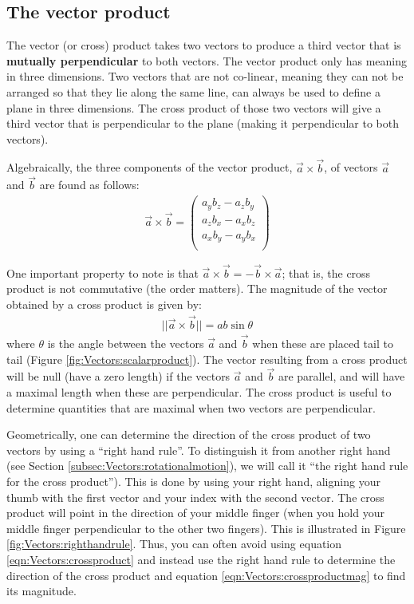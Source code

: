 \subsection{The vector product}
The vector (or cross) product takes two vectors to produce a third vector that is \textbf{mutually perpendicular} to both vectors. The vector product only has meaning in three dimensions. Two vectors that are not co-linear, meaning they can not be arranged so that they lie along the same line, can always be used to define a plane in three dimensions. The cross product of those two vectors will give a third vector that is perpendicular to the plane (making it perpendicular to both vectors). 

Algebraically, the three components of the vector product, $\vec a\times \vec b$, of vectors $\vec a$ and $\vec b$ are found as follows:
\begin{align}
\label{eqn:Vectors:crossproduct}
\vec a \times \vec b =\begin{pmatrix}
           a_yb_z - a_z b_y\\
           a_zb_x - a_x b_z\\
           a_xb_y - a_y b_x\\
         \end{pmatrix}
\end{align}

One important property to note is that $\vec a \times \vec b = -\vec b \times \vec a$; that is, the cross product is not commutative (the order matters). The magnitude of the vector obtained by a cross product is given by:
\begin{align}
\label{eqn:Vectors:crossproductmag}
||\vec a \times \vec b ||=ab\sin\theta
\end{align}
where $\theta$ is the angle between the vectors $\vec a$ and $\vec b$ when these are placed tail to tail (Figure \ref{fig:Vectors:scalarproduct}). The vector resulting from a cross product will be null (have a zero length) if the vectors $\vec a$ and $\vec b$ are parallel, and will have a maximal length when these are perpendicular. The cross product is useful to determine quantities that are maximal when two vectors are perpendicular. 

Geometrically, one can determine the direction of the cross product of two vectors by using a ``right hand rule''. To distinguish it from another right hand (see Section \ref{subsec:Vectors:rotationalmotion}), we will call it ``the right hand rule for the cross product''). This is done by using your right hand, aligning your thumb with the first vector and your index with the second vector. The cross product will point in the direction of your middle finger (when you hold your middle finger perpendicular to the other two fingers). This is illustrated in Figure \ref{fig:Vectors:righthandrule}. Thus, you can often avoid using equation \ref{eqn:Vectors:crossproduct} and instead use the right hand rule to determine the direction of the cross product and equation \ref{eqn:Vectors:crossproductmag} to find its magnitude.

